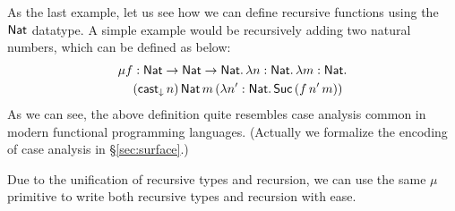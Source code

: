 As the last example, let us see how we can define recursive functions using the $\mathsf{Nat}$ datatype. A simple example would be recursively adding two natural numbers, which can be defined as below:
\begin{align*}
  \mu f &: \mathsf{Nat} \rightarrow \mathsf{Nat} \rightarrow \mathsf{Nat}.\,\lambda n : \mathsf{Nat}.\,\lambda m : \mathsf{Nat}.\\
  &(\mathsf{cast}_\downarrow\,n)\,\mathsf{Nat}\,m\,(\lambda n':\mathsf{Nat}.\,\mathsf{Suc}\,(f\,n'\,m))
\end{align*}
As we can see, the above definition quite resembles case analysis common in modern functional programming languages. (Actually we formalize the encoding of case analysis in \S\ref{sec:surface}.)

Due to the unification of recursive types and recursion, we can use the same $\mu$ primitive to write both recursive types and recursion with ease.

